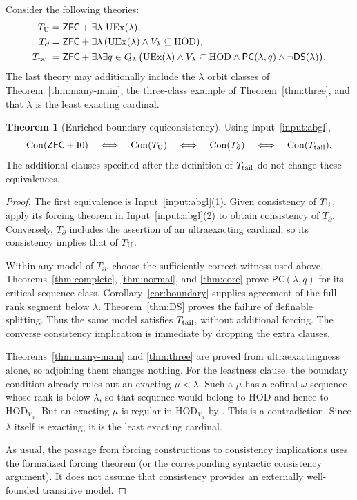 \documentclass[11pt,letterpaper]{article}
\theoremstyle{definition}
\newtheorem{theorem}[definition]{Theorem}
\numberwithin{equation}{section}
\newcommand{\ZFC}{\mathsf{ZFC}}
\newcommand{\HOD}{\mathrm{HOD}}
\newcommand{\UEx}{\operatorname{UEx}}
\newcommand{\Con}{\operatorname{Con}}
\newcommand{\Izero}{\mathrm{I0}}
\newcommand{\DS}{\mathsf{DS}}
\newcommand{\PC}{\mathsf{PC}}
\begin{document}
Consider the following theories:
\begin{align*}
 T_{\rm U}&=\ZFC+\exists\lambda\,\UEx(\lambda),\\
 T_{\partial}&=\ZFC+\exists\lambda\,
           (\UEx(\lambda)\wedge V_\lambda\subseteq\HOD),\\
 T_{\rm tail}&=\ZFC+\exists\lambda\exists q\in Q_\lambda\,
  \bigl(\UEx(\lambda)\wedge V_\lambda\subseteq\HOD
         \wedge\PC(\lambda,q)\wedge\neg\DS(\lambda)\bigr).
\end{align*}
The last theory may additionally include the $\lambda$ orbit classes of Theorem~\ref{thm:many-main}, the three-class example of Theorem~\ref{thm:three}, and that $\lambda$ is the least exacting cardinal.

\begin{theorem}[Enriched boundary equiconsistency]\label{thm:equiconsistency}
Using Input~\ref{input:abgl},
\[
 \Con(\ZFC+\Izero)
 \quad\Longleftrightarrow\quad\Con(T_{\rm U})
 \quad\Longleftrightarrow\quad\Con(T_{\partial})
 \quad\Longleftrightarrow\quad\Con(T_{\rm tail}).
\]
The additional clauses specified after the definition of $T_{\rm tail}$ do not change these equivalences.
\end{theorem}

\begin{proof}
The first equivalence is Input~\ref{input:abgl}(1). Given consistency of $T_{\rm U}$, apply its forcing theorem in Input~\ref{input:abgl}(2) to obtain consistency of $T_{\partial}$. Conversely, $T_{\partial}$ includes the assertion of an ultraexacting cardinal, so its consistency implies that of $T_{\rm U}$.

Within any model of $T_{\partial}$, choose the sufficiently correct witness used above. Theorems~\ref{thm:complete}, \ref{thm:normal}, and \ref{thm:core} prove $\PC(\lambda,q)$ for its critical-sequence class. Corollary~\ref{cor:boundary} supplies agreement of the full rank segment below $\lambda$. Theorem~\ref{thm:DS} proves the failure of definable splitting. Thus the same model satisfies $T_{\rm tail}$, without additional forcing. The converse consistency implication is immediate by dropping the extra clauses.

Theorems~\ref{thm:many-main} and \ref{thm:three} are proved from ultraexactingness alone, so adjoining them changes nothing. For the leastness clause, the boundary condition already rules out an exacting $\mu<\lambda$. Such a $\mu$ has a cofinal $\omega$-sequence whose rank is below $\lambda$, so that sequence would belong to $\HOD$ and hence to $\HOD_{V_\mu}$. But an exacting $\mu$ is regular in $\HOD_{V_\mu}$ by \cite[Theorem~2.10]{abl}. This is a contradiction. Since $\lambda$ itself is exacting, it is the least exacting cardinal.

As usual, the passage from forcing constructions to consistency implications uses the formalized forcing theorem (or the corresponding syntactic consistency argument). It does not assume that consistency provides an externally well-founded transitive model.
\end{proof}
\end{document}
